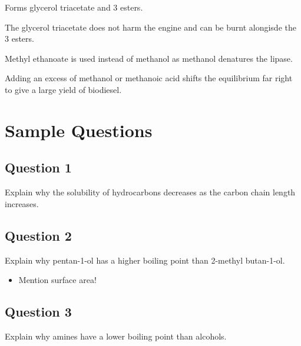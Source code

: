 \documentclass[a4paper,11pt]{article}
\begin{document}
Forms glycerol triacetate and 3 esters.

The glycerol triacetate does not harm the engine and can be burnt alongisde the
3 esters.

Methyl ethanoate is used instead of methanol as methanol denatures the lipase.

Adding an excess of methanol or methanoic acid shifts the equilibrium far right
to give a large yield of biodiesel.




\section{Sample Questions}

\subsection{Question 1}

Explain why the solubility of hydrocarbons decreases as the carbon chain length
increases.

\subsection{Question 2}

Explain why pentan-1-ol has a higher boiling point than 2-methyl butan-1-ol.

\begin{itemize}
\item Mention surface area!
\end{itemize}

\subsection{Question 3}

Explain why amines have a lower boiling point than alcohols.
\end{document}
